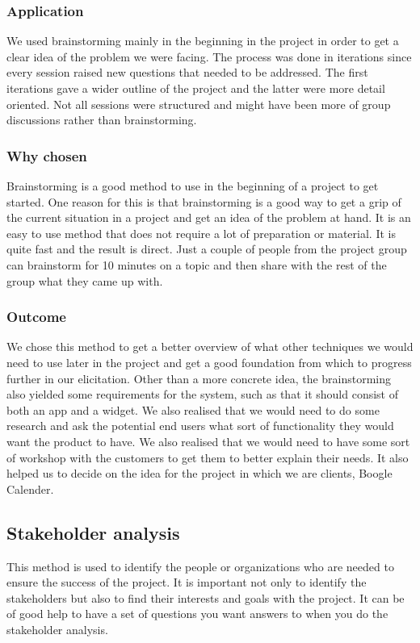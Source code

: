 \documentclass[a4paper]{article}
\begin{document}
		\subsubsection{Application}
We used brainstorming mainly in the beginning in the project in order to get a clear idea of the problem we were facing. The process was done in iterations since every session raised new questions that needed to be addressed. The first iterations gave a wider outline of the project and the latter were more detail oriented. Not all sessions were structured and might have been more of group discussions rather than brainstorming.
		\subsubsection{Why chosen}
Brainstorming is a good method to use in the beginning of a project to get started. One reason for this is that brainstorming is a good way to get a grip of the current situation in a project and get an idea of the problem at hand. It is an easy to use method that does not require a lot of preparation or material. It is quite fast and the result is direct. Just a couple of people from the project group can brainstorm for 10 minutes on a topic and then share with the rest of the group what they came up with. 

		\subsubsection{Outcome}
		 We chose this method to get a better overview of what other techniques we would need to use later in the project and get a good foundation from which to progress further in our elicitation. Other than a more concrete idea, the brainstorming also yielded some requirements for the system, such as that it should consist of both an app and a widget. We also realised that we would need to do some research and ask the potential end users what sort of functionality they would want the product to have. We also realised that we would need to have some sort of workshop with the customers to get them to better explain their needs. It also helped us to decide on the idea for the project in which we are clients, Boogle Calender.

		\subsection{Stakeholder analysis}
 This method is used to identify the people or organizations who are needed to ensure the success of the project. It is important not only to identify the stakeholders but also to find their interests and goals with the project. It can be of good help to have a set of questions you want answers to when you do the stakeholder analysis.
\end{document}

